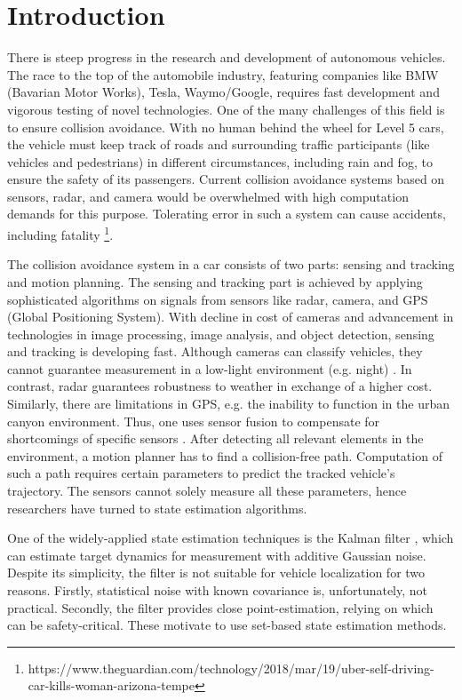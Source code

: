 \chapter{Introduction} \label{ch:intro}
There is steep progress in the research and development of autonomous vehicles. The race to the top of the automobile industry, featuring companies like BMW (Bavarian Motor Works), Tesla, Waymo/Google, requires fast development and vigorous testing of novel technologies. One of the many challenges of this field is to ensure collision avoidance. With no human behind the wheel for Level 5 \cite{SAE2014} cars, the vehicle must keep track of roads and surrounding traffic participants (like vehicles and pedestrians) in different circumstances, including rain and fog, to ensure the safety of its passengers. Current collision avoidance systems based on sensors, radar, and camera would be overwhelmed with high computation demands for this purpose. Tolerating error in such a system can cause accidents, including fatality \footnote{https://www.theguardian.com/technology/2018/mar/19/uber-self-driving-car-kills-woman-arizona-tempe}.


The collision avoidance system in a car consists of two parts: sensing and tracking and motion planning. The sensing and tracking part is achieved by applying sophisticated algorithms on signals from sensors like radar, camera, and GPS (Global Positioning System). With decline in cost of cameras and advancement in technologies in image processing, image analysis, and object detection, sensing and tracking is developing fast. Although cameras can classify vehicles, they cannot guarantee measurement in a low-light environment (e.g. night) \cite{Hirz2018}. In contrast, radar guarantees robustness to weather in exchange of a higher cost. Similarly, there are limitations in GPS, e.g. the inability to function in the urban canyon environment. Thus, one uses sensor fusion to compensate for shortcomings of specific sensors . After detecting all relevant elements in the environment, a motion planner has to find a collision-free path. Computation of such a path requires certain parameters to predict the tracked vehicle's trajectory. The sensors cannot solely measure all these parameters, hence researchers have turned to state estimation algorithms.

One of the widely-applied state estimation techniques is the Kalman filter \cite{Kalman}, which can estimate target dynamics for measurement with additive Gaussian noise. Despite its simplicity, the filter is not suitable for vehicle localization for two reasons. Firstly, statistical noise with known covariance is, unfortunately, not practical. Secondly, the filter provides close point-estimation, relying on which can be safety-critical. These motivate to use set-based state estimation methods.


